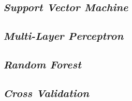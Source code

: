 \lipsum[4]

\subsection{\textit{Support Vector Machine}}

\lipsum[5]

\subsection{\textit{Multi-Layer Perceptron}}

\lipsum[6]

\subsection{\textit{Random Forest}}

\lipsum[7]

\subsection{\textit{Cross Validation}}

\lipsum[8]
